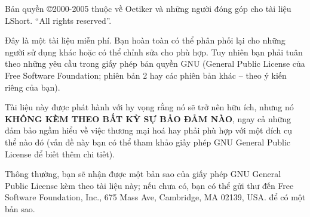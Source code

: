 \pagebreak
\begin{small}
  Bản quyền \copyright 2000-2005 thuộc về Oetiker và những người
  đóng góp cho tài liệu LShort. ``All rights reserved''.

Đây là một tài liệu miễn phí. Bạn hoàn toàn có thể phân phối lại cho những người sử dụng khác hoặc có thể chỉnh sửa cho phù hợp. Tuy nhiên bạn phải tuân theo những yêu cầu trong giấy phép bản quyền GNU (General Public License của Free Software Foundation; phiên bản 2 hay các phiên bản khác -- theo ý kiến riêng của bạn).
  
  Tài liệu này được phát hành với hy vọng rằng nó sẽ trở nên hữu ích,
  nhưng nó \textbf{KHÔNG KÈM THEO BẤT KỲ SỰ BẢO ĐẢM NÀO}, ngay cả những
  đảm bảo ngầm hiểu về việc thương mại hoá hay phải phù hợp với một
  đích cụ thể nào đó (vấn đề này bạn có thể tham khảo giấy phép GNU General Public License để biết thêm chi tiết)\@.

  Thông thường, bạn sẽ nhận được một bản sao của giấy phép GNU
  General Public License kèm theo tài liệu này; nếu chưa có, bạn
  có thể gửi thư đến Free Software Foundation, Inc.,
  675 Mass Ave, Cambridge, MA 02139, USA. để có một bản sao.
\end{small}



